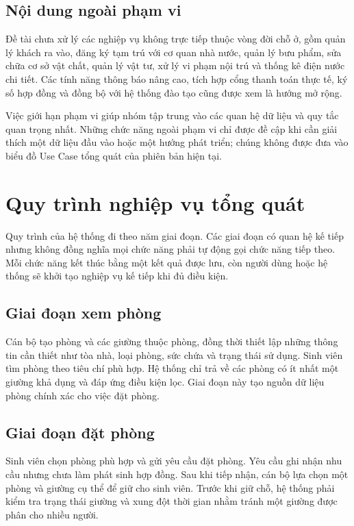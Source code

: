 \subsection{Nội dung ngoài phạm vi}

Đề tài chưa xử lý các nghiệp vụ không trực tiếp thuộc vòng đời chỗ ở, gồm quản lý khách ra vào, đăng ký tạm trú với cơ quan nhà nước, quản lý bưu phẩm, sửa chữa cơ sở vật chất, quản lý vật tư, xử lý vi phạm nội trú và thống kê điện nước chi tiết. Các tính năng thông báo nâng cao, tích hợp cổng thanh toán thực tế, ký số hợp đồng và đồng bộ với hệ thống đào tạo cũng được xem là hướng mở rộng.

Việc giới hạn phạm vi giúp nhóm tập trung vào các quan hệ dữ liệu và quy tắc quan trọng nhất. Những chức năng ngoài phạm vi chỉ được đề cập khi cần giải thích một dữ liệu đầu vào hoặc một hướng phát triển; chúng không được đưa vào biểu đồ Use Case tổng quát của phiên bản hiện tại.

\section{Quy trình nghiệp vụ tổng quát}

Quy trình của hệ thống đi theo năm giai đoạn. Các giai đoạn có quan hệ kế tiếp nhưng không đồng nghĩa mọi chức năng phải tự động gọi chức năng tiếp theo. Mỗi chức năng kết thúc bằng một kết quả được lưu, còn người dùng hoặc hệ thống sẽ khởi tạo nghiệp vụ kế tiếp khi đủ điều kiện.

\subsection{Giai đoạn xem phòng}

Cán bộ tạo phòng và các giường thuộc phòng, đồng thời thiết lập những thông tin cần thiết như tòa nhà, loại phòng, sức chứa và trạng thái sử dụng. Sinh viên tìm phòng theo tiêu chí phù hợp. Hệ thống chỉ trả về các phòng có ít nhất một giường khả dụng và đáp ứng điều kiện lọc. Giai đoạn này tạo nguồn dữ liệu phòng chính xác cho việc đặt phòng.

\subsection{Giai đoạn đặt phòng}

Sinh viên chọn phòng phù hợp và gửi yêu cầu đặt phòng. Yêu cầu ghi nhận nhu cầu nhưng chưa làm phát sinh hợp đồng. Sau khi tiếp nhận, cán bộ lựa chọn một phòng và giường cụ thể để giữ cho sinh viên. Trước khi giữ chỗ, hệ thống phải kiểm tra trạng thái giường và xung đột thời gian nhằm tránh một giường được phân cho nhiều người.

